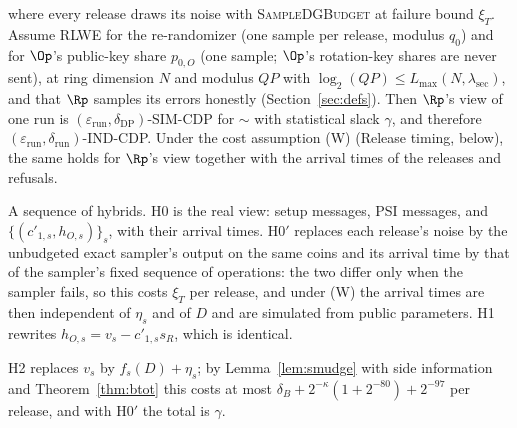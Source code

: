 where every release draws its noise with \textsc{SampleDGBudget} at failure bound $\xi_T$. Assume RLWE for the re-randomizer (one sample per release, modulus $q_0$) and for $\Op$'s public-key share $p_{0,O}$ (one sample; $\Op$'s rotation-key shares are never sent), at ring dimension $N$ and modulus $QP$ with $\log_2(QP) \le L_{\max}(N, \lambda_{\mathrm{sec}})$, and that $\Rp$ samples its errors honestly (Section~\ref{sec:defs}). Then $\Rp$'s view of one run is $(\varepsilon_{\mathrm{run}}, \delta_{\mathrm{DP}})$-SIM-CDP for $\sim$ with statistical slack $\gamma$, and therefore $(\varepsilon_{\mathrm{run}}, \delta_{\mathrm{run}})$-IND-CDP. Under the cost assumption (W) (Release timing, below), the same holds for $\Rp$'s view together with the arrival times of the releases and refusals.

A sequence of hybrids. H0 is the real view: setup messages, PSI messages, and $\{(c'_{1,s}, h_{O,s})\}_s$, with their arrival times. H0$'$ replaces each release's noise by the unbudgeted exact sampler's output on the same coins and its arrival time by that of the sampler's fixed sequence of operations: the two differ only when the sampler fails, so this costs $\xi_T$ per release, and under (W) the arrival times are then independent of $\eta_s$ and of $D$ and are simulated from public parameters. H1 rewrites $h_{O,s} = v_s - c'_{1,s}s_R$, which is identical.

H2 replaces $v_s$ by $f_s(D) + \eta_s$; by Lemma~\ref{lem:smudge} with side information and Theorem~\ref{thm:btot} this costs at most $\delta_B + 2^{-\kappa}(1 + 2^{-80}) + 2^{-97}$ per release, and with H0$'$ the total is $\gamma$.

